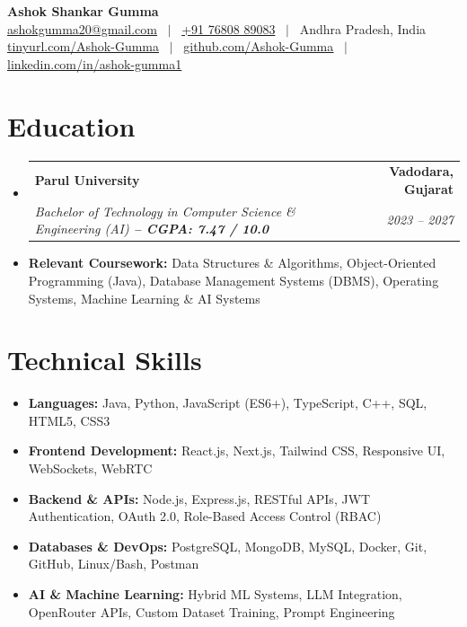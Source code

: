 \documentclass[letterpaper,10pt]{article}
\makeatletter
\newcommand{\resumeSubheading}[4]{
  \item
    \begin{tabular*}{\linewidth}[t]{l@{\extracolsep{\fill}}r}
      \textbf{#1} & \textbf{\small #2} \\
      \textit{\small#3} & \textit{\small #4} \\
    \end{tabular*}
}
\newcommand{\resumeSubHeadingListStart}{\begin{itemize}[leftmargin=0.15in, label={}, itemsep=2pt, topsep=1pt, parsep=0pt, partopsep=0pt]}
\newcommand{\resumeSubHeadingListEnd}{\end{itemize}}
\makeatother
\begin{document}
\begin{center}
    {\Huge \bfseries Ashok Shankar Gumma} \\ \vspace{2pt}
    \small 
    \href{mailto:ashokgumma20@gmail.com}{\underline{ashokgumma20@gmail.com}} ~$\vert$~
    \href{tel:+917680889083}{+91 76808 89083} ~$\vert$~
    Andhra Pradesh, India \\ \vspace{1.5pt}
    \href{https://tinyurl.com/Ashok-Gumma}{\underline{tinyurl.com/Ashok-Gumma}} ~$\vert$~
    \href{https://github.com/Ashok-Gumma}{\underline{github.com/Ashok-Gumma}} ~$\vert$~
    \href{https://linkedin.com/in/ashok-gumma1}{\underline{linkedin.com/in/ashok-gumma1}}
\end{center}
\vspace{-5pt}

\section{Education}
  \resumeSubHeadingListStart
    \resumeSubheading
      {Parul University}{Vadodara, Gujarat}
      {Bachelor of Technology in Computer Science \& Engineering (AI) \textnormal{\textbf{-- CGPA: 7.47 / 10.0}}}{2023 -- 2027}
      \vspace{-1.5pt}
      \item \small{\textbf{Relevant Coursework:} Data Structures \& Algorithms, Object-Oriented Programming (Java), Database Management Systems (DBMS), Operating Systems, Machine Learning \& AI Systems}
  \resumeSubHeadingListEnd

\section{Technical Skills}
 \begin{itemize}[leftmargin=0.15in, label={}, itemsep=1.5pt, topsep=1.2pt, partopsep=0pt, parsep=0pt]
    \item \small{\textbf{Languages:} Java, Python, JavaScript (ES6+), TypeScript, C++, SQL, HTML5, CSS3}
    \item \small{\textbf{Frontend Development:} React.js, Next.js, Tailwind CSS, Responsive UI, WebSockets, WebRTC}
    \item \small{\textbf{Backend \& APIs:} Node.js, Express.js, RESTful APIs, JWT Authentication, OAuth 2.0, Role-Based Access Control (RBAC)}
    \item \small{\textbf{Databases \& DevOps:} PostgreSQL, MongoDB, MySQL, Docker, Git, GitHub, Linux/Bash, Postman}
    \item \small{\textbf{AI \& Machine Learning:} Hybrid ML Systems, LLM Integration, OpenRouter APIs, Custom Dataset Training, Prompt Engineering}
 \end{itemize}
\end{document}
